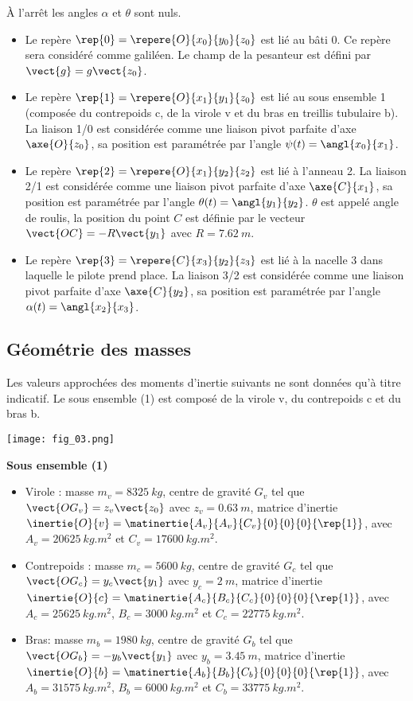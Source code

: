 \begin{multicols}{2}
À l'arrêt les angles $\alpha$ et $\theta$ sont nuls.

\begin{itemize}
\item Le repère $\rep{0}=\repere{O}{x_0}{y_0}{z_0}$ est lié au bâti 0. Ce repère sera considéré comme galiléen. Le champ de la pesanteur est défini par $\vect{g}=g\vect{z_0}$.
\item Le repère $\rep{1}=\repere{O}{x_1}{y_1}{z_0}$ est lié au sous ensemble 1 (composée du contrepoids c, de la virole v et du bras en treillis tubulaire b). La liaison 1/0 est considérée comme une liaison pivot parfaite d’axe $\axe{O}{z_0}$, sa position est paramétrée par l’angle $\psi(t)=\angl{x_0}{x_1}$.
\item Le repère $\rep{2}=\repere{O}{x_1}{y_2}{z_2}$ est lié à l'anneau 2. La liaison 2/1 est considérée comme une liaison pivot parfaite d’axe $\axe{C}{x_1}$, sa position est paramétrée par l’angle $\theta(t)=\angl{y_1}{y_2}$. $\theta$ est appelé angle de roulis, la position du point $C$ est définie par le vecteur $\vect{OC}=-R\vect{y_1}$ avec $R=\SI{7,62}{m}$. 
\item Le repère $\rep{3}=\repere{C}{x_3}{y_2}{z_3}$ est lié à la nacelle 3 dans laquelle le pilote prend place. La liaison 3/2 est considérée comme une liaison pivot parfaite d’axe $\axe{C}{y_2}$, sa position est paramétrée par l’angle $\alpha(t)=\angl{x_2}{x_3}$.
\end{itemize}

\subsection*{Géométrie des masses}
Les valeurs approchées des moments d’inertie suivants ne sont données qu’à titre indicatif. Le sous ensemble (1) est composé de la virole v, du contrepoids c et du bras b. 

\begin{center}
\texttt{[image: fig\_03.png]}
\end{center}


\textbf{Sous ensemble (1)}
\begin{itemize}
\item Virole : masse $m_v=\SI{8325}{kg}$, centre de gravité 
$G_v$ tel que $\vect{OG_v}=z_v\vect{z_0}$ avec $z_v=\SI{0,63}{m}$, matrice d'inertie $\inertie{O}{v}=\matinertie{A_v}{A_v}{C_v}{0}{0}{0}{\rep{1}}$, avec $A_v=\SI{20625}{kg.m^2}$ et $C_v=\SI{17600}{kg.m^2}$.
\item Contrepoids : masse $m_c=\SI{5600}{kg}$, centre de gravité 
$G_c$ tel que $\vect{OG_c}=y_c\vect{y_1}$ avec $y_c=\SI{2}{m}$, matrice d'inertie $\inertie{O}{c}=\matinertie{A_c}{B_c}{C_c}{0}{0}{0}{\rep{1}}$, avec $A_c=\SI{25625}{kg.m^2}$, $B_c=\SI{3000}{kg.m^2}$ et $C_c=\SI{22775}{kg.m^2}$.
\item Bras: masse $m_b=\SI{1980}{kg}$, centre de gravité 
$G_b$ tel que $\vect{OG_b}=-y_b\vect{y_1}$ avec $y_b=\SI{3,45}{m}$, matrice d'inertie $\inertie{O}{b}=\matinertie{A_b}{B_b}{C_b}{0}{0}{0}{\rep{1}}$, avec $A_b=\SI{31575}{kg.m^2}$, $B_b=\SI{6000}{kg.m^2}$ et $C_b=\SI{33775}{kg.m^2}$.
\end{itemize}


\end{multicols}
